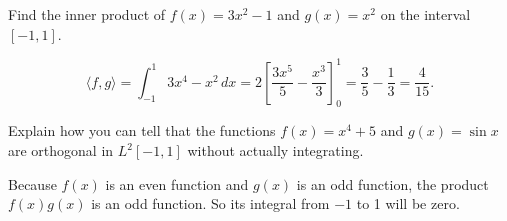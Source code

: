\documentclass[11pt]{exam}
\newcommand{\inner}[1]{\langle {#1} \rangle}
\begin{document}
\begin{questions}
\question Find the inner product of $f(x) = 3x^2 - 1$ and $g(x) = x^2$ on the interval $[-1,1]$. 
\begin{solution}
$$\inner{f, g} = \int_{-1}^1 3 x^4 - x^2 \,dx = 2 \left[ \frac{3x^5}{5} - \frac{x^3}{3} \right]_{0}^1 = \frac{3}{5} - \frac{1}{3} = \frac{4}{15}.$$
\end{solution}
\vfill

\question Explain how you can tell that the functions $f(x) = x^4 + 5$ and $g(x) = \sin x$ are orthogonal in $L^2[-1,1]$ without actually integrating.  
\begin{solution}
Because $f(x)$ is an even function and $g(x)$ is an odd function, the product $f(x) g(x)$ is an odd function. So its integral from $-1$ to 1 will be zero. 
\end{solution}
\vfill 
\end{questions}
\end{document}
